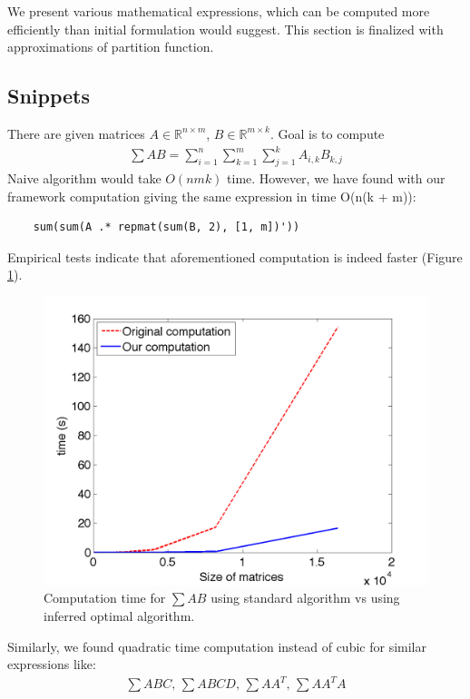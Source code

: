 We present various mathematical expressions, which can be computed more efficiently
than initial formulation would suggest. This section is finalized with  
approximations of partition function. 

\subsection{Snippets}

There are given matrices $A \in \mathbb{R}^{n \times m}$, $B \in \mathbb{R}^{m \times k}$. 
Goal is to compute 
\begin{align*}
	\sum AB = \sum_{i = 1}^n \sum_{k = 1}^m \sum_{j = 1}^k A_{i, k} B_{k, j} 
\end{align*}
Naive algorithm would take $O(nmk)$ time. However, we have found with our framework 
computation giving the same expression in time O(n(k + m)):

\begin{verbatim}
	sum(sum(A .* repmat(sum(B, 2), [1, m])'))
\end{verbatim}

Empirical tests indicate that aforementioned computation is indeed faster (Figure \ref{ab}).

\begin{figure}[h]
\centering
\includegraphics[scale=0.3]{img/ab.png}
\caption{Computation time for $\sum AB$ using standard algorithm vs using inferred optimal algorithm.}
\label{ab}
\end{figure}


Similarly, we found quadratic time computation instead of cubic for similar expressions like: 
\begin{align*}
	\sum ABC\text{, }\sum ABCD\text{, }\sum AA^T\text{, }\sum AA^TA
\end{align*}

